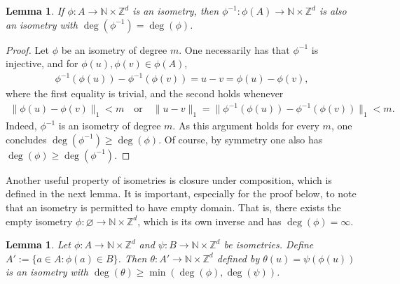 \documentclass[11pt,reqno]{amsart}
\numberwithin{equation}{section}
\newtheorem{lemma}[thm]{Lemma}
\theoremstyle{definition}
\begin{document}
\begin{lemma} \label{infinite_degree}
If $\phi: A \to {\mathbb{N}} \times {\mathbb{Z}}^d$ is an isometry, then $\phi^{-1}: \phi(A) \to {\mathbb{N}} \times {\mathbb{Z}}^d$ is also an isometry with $\deg(\phi^{-1}) = \deg(\phi)$.
\end{lemma}

\begin{proof}
Let $\phi$ be an isometry of degree $m$.
One necessarily has that $\phi^{-1}$ is injective, and for $\phi(u),\phi(v) \in \phi(A)$,
{\begin{align*} {
\phi^{-1}(\phi(u)) - \phi^{-1}(\phi(v)) = u - v = \phi(u) - \phi(v),
} \end{align*}}
where the first equality is trivial, and the second holds whenever
{\begin{align*} {
\|\phi(u) - \phi(v)\|_1 < m
\quad \text{or} \quad
\|u - v\|_1 = \|\phi^{-1}(\phi(u)) - \phi^{-1}(\phi(v))\|_1 < m.
} \end{align*}}
Indeed, $\phi^{-1}$ is an isometry of degree $m$.
As this argument holds for every $m$, one concludes $\deg(\phi^{-1}) \geq \deg(\phi)$.
Of course, by symmetry one also has $\deg(\phi) \geq \deg(\phi^{-1})$.
\end{proof}

Another useful property of isometries is closure under composition, which is defined in the next lemma.
It is important, especially for the proof below, to note that an isometry is permitted to have empty domain.
That is, there exists the empty isometry $\phi: \varnothing \to {\mathbb{N}} \times {\mathbb{Z}}^d$, which is its own inverse and has $\deg(\phi) = \infty$.

\begin{lemma} \label{composition}
Let $\phi : A \to {\mathbb{N}} \times {\mathbb{Z}}^d$ and $\psi : B \to {\mathbb{N}} \times {\mathbb{Z}}^d$ be isometries.
Define $A' := \{a \in A : \phi(a) \in B\}$.  Then $\theta: A' \to {\mathbb{N}} \times {\mathbb{Z}}^d$ defined by $\theta(u) = \psi(\phi(u))$ is an isometry with $\deg(\theta) \geq \min(\deg(\phi),\deg(\psi))$.
\end{lemma}
\end{document}

